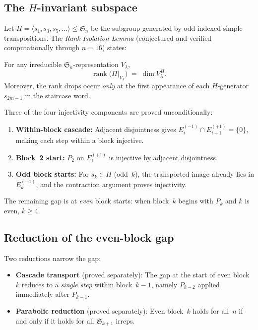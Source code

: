 \documentclass[11pt]{article}
\theoremstyle{definition}
\theoremstyle{remark}
\newcommand{\Sym}{\mathfrak{S}}
\newcommand{\rk}{\operatorname{rank}}
\begin{document}
\subsection{The $H$-invariant subspace}

Let $H = \langle s_1, s_3, s_5, \ldots \rangle \le \Sym_n$ be the
subgroup generated by odd-indexed simple transpositions.  The
\emph{Rank Isolation Lemma} (conjectured and verified computationally
through $n = 16$) states:

\begin{conjecture}
For any irreducible $\Sym_n$-representation $V_\lambda$,
\[
  \rk\bigl(\Pi\big|_{V_\lambda}\bigr) \;=\; \dim V_\lambda^H.
\]
Moreover, the rank drops occur \emph{only} at the first appearance of
each $H$-generator $s_{2m-1}$ in the staircase word.
\end{conjecture}

Three of the four injectivity components are proved unconditionally:
\begin{enumerate}
  \item \textbf{Within-block cascade:} Adjacent disjointness gives
    $E_i^{(-1)} \cap E_{i+1}^{(+1)} = \{0\}$, making each step within
    a block injective.
  \item \textbf{Block~2 start:} $P_2$ on $E_1^{(+1)}$ is injective
    by adjacent disjointness.
  \item \textbf{Odd block starts:} For $s_{k} \in H$ (odd~$k$), the
    transported image already lies in $E_k^{(+1)}$, and the
    contraction argument proves injectivity.
\end{enumerate}

The remaining gap is at \emph{even} block starts: when block~$k$
begins with $P_k$ and $k$ is even, $k \ge 4$.

\subsection{Reduction of the even-block gap}

Two reductions narrow the gap:

\begin{itemize}
  \item \textbf{Cascade transport} (proved separately): The gap at the
    start of even block~$k$ reduces to a \emph{single step} within
    block~$k{-}1$, namely $P_{k-2}$ applied immediately after $P_{k-1}$.
  \item \textbf{Parabolic reduction} (proved separately): Even
    block~$k$ holds for all~$n$ if and only if it holds for all
    $\Sym_{k+1}$ irreps.
\end{itemize}
\end{document}
